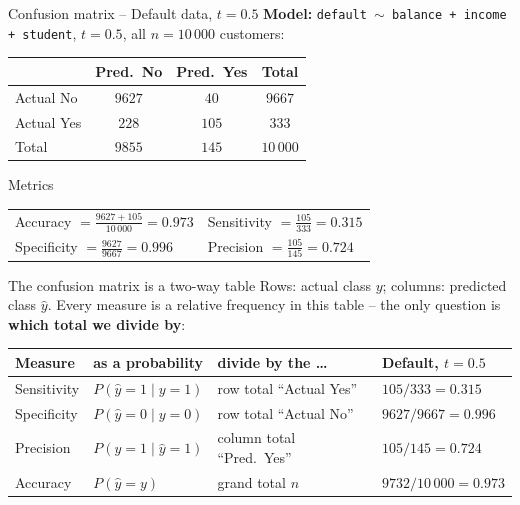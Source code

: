\documentclass[aspectratio=169,11pt]{beamer}
\begin{document}
\begin{frame}{Confusion matrix -- Default data, $t=0.5$}
  \textbf{Model:} \texttt{default $\sim$ balance + income + student},
  $t=0.5$, all $n=10\,000$ customers:
  \begin{center}
    \renewcommand{\arraystretch}{1.25}
    \begin{tabular}{l|cc|c}
      \toprule
      & Pred.\ No & Pred.\ Yes & Total\\
      \midrule
      Actual No & $9627$ & $40$ & $9667$\\
      Actual Yes & $228$ & $105$ & $333$\\
      \midrule
      Total & $9855$ & $145$ & $10\,000$\\
      \bottomrule
    \end{tabular}
  \end{center}
  \begin{exampleblock}{Metrics}
    \begin{tabular}{@{}ll@{}}
      Accuracy $=\frac{9627+105}{10\,000}=0.973$ & Sensitivity $=\frac{105}{333}=0.315$\\[4pt]
      Specificity $=\frac{9627}{9667}=0.996$ & Precision $=\frac{105}{145}=0.724$
    \end{tabular}
  \end{exampleblock}
\end{frame}

\begin{frame}{The confusion matrix is a two-way table}
  Rows: actual class $y$; columns: predicted class $\hat y$. Every measure is
  a relative frequency in this table -- the only question is \textbf{which
  total we divide by}:
  \begin{center}
    \renewcommand{\arraystretch}{1.22}
    \begin{tabular}{@{}llll@{}}
      \toprule
      \textbf{Measure} & \textbf{as a probability} & \textbf{divide by the \ldots} & \textbf{Default, $t=0.5$}\\
      \midrule
      Sensitivity & $P(\hat y=1\mid y=1)$ & row total ``Actual Yes'' & $105/333=0.315$\\
      Specificity & $P(\hat y=0\mid y=0)$ & row total ``Actual No'' & $9627/9667=0.996$\\
      Precision & $P(y=1\mid \hat y=1)$ & column total ``Pred.\ Yes'' & $105/145=0.724$\\
      Accuracy & $P(\hat y=y)$ & grand total $n$ & $9732/10\,000=0.973$\\
      \bottomrule
    \end{tabular}
  \end{center}
\end{frame}
\end{document}
